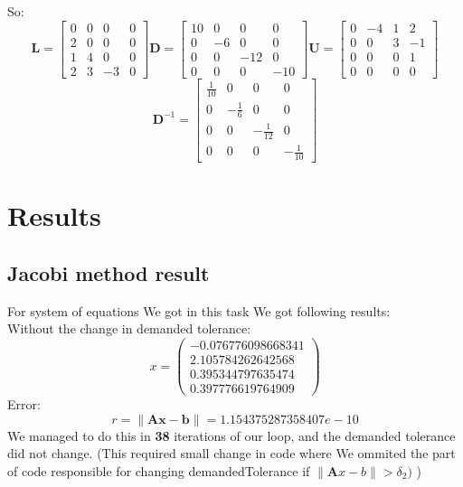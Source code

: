 \documentclass[12pt]{report}
\begin{document}
So:
\[
\textbf{L} = \begin{bmatrix}
0 & 0 & 0 & 0 \\
2 & 0 & 0 & 0 \\
1 & 4 & 0 & 0 \\
2 & 3 & -3 & 0
\end{bmatrix}
\textbf{D} = \begin{bmatrix}
10 & 0 & 0 & 0 \\
0 & -6 & 0 & 0 \\
0 & 0 & -12 & 0 \\
0 & 0 & 0 & -10
\end{bmatrix}
\textbf{U} = \begin{bmatrix}
0 & -4 & 1 & 2 \\
0 & 0 & 3 & -1 \\
0 & 0 & 0 & 1 \\
0 & 0 & 0 & 0
\end{bmatrix}
\]
\[
\textbf{D}^{-1} = \begin{bmatrix}
\frac{1}{10} & 0 & 0 & 0 \\
0 & - \frac{1}{6} & 0 & 0 \\
0 & 0 & - \frac{1}{12} & 0 \\
0 & 0 & 0 & - \frac{1}{10}
\end{bmatrix}
\]

\section{Results}

\subsection{Jacobi method result}
For system of equations We got in this task We got following results:
\\
Without the change in demanded tolerance:
\[ x = \left( \begin{array}{cc}
  -0.076776098668341 \\
   2.105784262642568 \\
   0.395344797635474 \\
   0.397776619764909
\end{array} \right)
\]
Error:
\[ r = \| \mathbf{A}\mathbf{x} - \mathbf{b}\| = 1.154375287358407e-10 \]
We managed to do this in \textbf{38} iterations of our loop, and the demanded tolerance did not change. (This required small change in code where We ommited the part of code responsible for changing demandedTolerance if $ \| \mathbf{A}x-b \| > \delta_2) $ )
\end{document}
